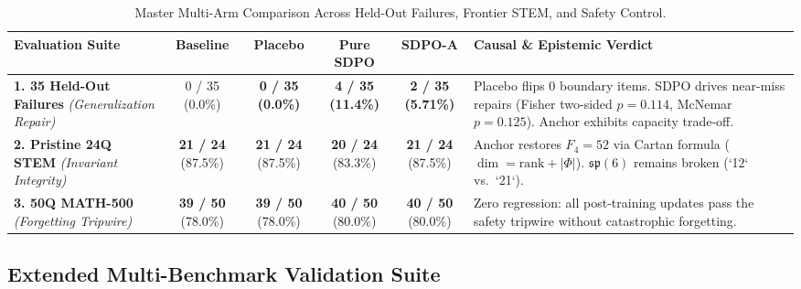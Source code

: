 \documentclass[11pt,a4paper]{article}
\begin{document}
\begin{table}[htbp]
\centering
\caption{Master Multi-Arm Comparison Across Held-Out Failures, Frontier STEM, and Safety Control.}
\label{tab:master_arms}
\small
\begin{tabular}{@{}p{3.4cm}ccccp{4.8cm}@{}}
\toprule
\textbf{Evaluation Suite} & \textbf{Baseline} & \textbf{Placebo} & \textbf{Pure SDPO} & \textbf{SDPO-A} & \textbf{Causal \& Epistemic Verdict} \\
\midrule
\textbf{1. 35 Held-Out Failures} \newline \textit{(Generalization Repair)} & 0 / 35 \newline (0.0\%) & \textbf{0 / 35} \newline \textbf{(0.0\%)} & \textbf{4 / 35} \newline \textbf{(11.4\%)} & \textbf{2 / 35} \newline \textbf{(5.71\%)} & Placebo flips 0 boundary items. SDPO drives near-miss repairs (Fisher two-sided $p=0.114$, McNemar $p=0.125$). Anchor exhibits capacity trade-off. \\
\addlinespace
\textbf{2. Pristine 24Q STEM} \newline \textit{(Invariant Integrity)} & \textbf{21 / 24} \newline (87.5\%) & \textbf{21 / 24} \newline (87.5\%) & \textbf{20 / 24} \newline (83.3\%) & \textbf{21 / 24} \newline (87.5\%) & Anchor restores $F_4=52$ via Cartan formula ($\dim = \mathrm{rank} + |\Phi|$). $\mathfrak{sp}(6)$ remains broken (`12` vs.\ `21`). \\
\addlinespace
\textbf{3. 50Q MATH-500} \newline \textit{(Forgetting Tripwire)} & \textbf{39 / 50} \newline (78.0\%) & \textbf{39 / 50} \newline (78.0\%) & \textbf{40 / 50} \newline (80.0\%) & \textbf{40 / 50} \newline (80.0\%) & Zero regression: all post-training updates pass the safety tripwire without catastrophic forgetting. \\
\bottomrule
\end{tabular}
\end{table}

\subsection{Extended Multi-Benchmark Validation Suite}
\end{document}
